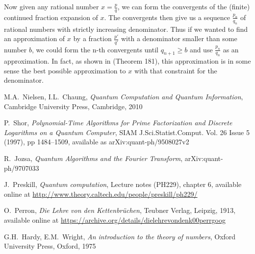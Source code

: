 \documentclass[a4paper, draft]{article}
\theoremstyle{own}
\theoremstyle{remark}
\begin{document}
Now given any rational number $x = \frac{p}{q}$, we can form the convergents of the (finite) continued fraction expansion of $x$. The convergents then give us a sequence $\frac{p_n}{q_n}$ of rational numbers with strictly increasing denominator. Thus if we wanted to find an approximation of $x$ by a fraction $\frac{p'}{q'}$ with a denominator smaller than some number $b$, we could form the n-th convergents until $q_{n+1} \geq b$ and use $\frac{p_n}{q_n}$ as an approximation. In fact, as shown in \cite{HW} (Theorem 181), this approximation is in some sense the best possible approximation to $x$ with that constraint for the denominator. 


\begin{thebibliography}{9}


M.A.~Nielsen, I.L.~Chaung, \emph{Quantum Computation and Quantum Information},
Cambridge University Press, Cambridge, 2010

P.~Shor, \emph{Polynomial-Time Algorithms for Prime Factorization and Discrete Logarithms on a Quantum Computer}, SIAM J.Sci.Statist.Comput. Vol. 26 Issue 5 (1997), pp 1484--1509, available as arXiv:quant-ph/9508027v2


R.~Jozsa, \emph{Quantum Algorithms and the Fourier Transform},  	arXiv:quant-ph/9707033

J.~Preskill, \emph{Quantum computation}, Lecture notes (PH229), chapter 6, available online at \url{http://www.theory.caltech.edu/people/preskill/ph229/}

O.~Perron, \emph{Die Lehre von den Kettenbr\"uchen}, Teubner Verlag, Leipzig, 1913, available online at \url{https://archive.org/details/dielehrevondenk00perrgoog}

G.H.~Hardy, E.M.~Wright, \emph{An introduction to the theory of numbers}, Oxford University Press, Oxford, 1975

\end{thebibliography}
\end{document}
